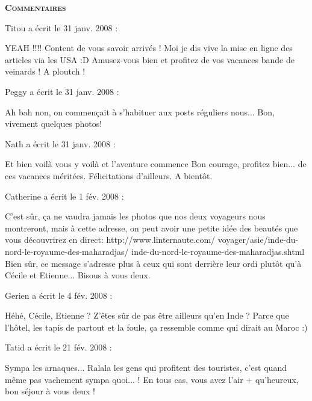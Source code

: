 \bigskip
\textbf{\textsc{Commentaires}}

\medskip
Titou a écrit le 31 janv. 2008 :
\begin{displayquote}
YEAH !!!!
Content de vous savoir arrivés ! Moi je dis vive la mise en ligne des articles via les USA :D Amusez-vous bien et profitez de vos vacances bande de veinards ! A ploutch !
\end{displayquote}

\medskip
Peggy a écrit le 31 janv. 2008 :
\begin{displayquote}
Ah bah non, on commençait à s'habituer aux posts réguliers nous... Bon, vivement quelques photos!
\end{displayquote}

\medskip
Nath a écrit le 31 janv. 2008 :
\begin{displayquote}
Et bien voilà vous y voilà  et l'aventure commence
Bon courage, profitez bien... de ces vacances méritées. Félicitations d'ailleurs.
A bientôt.
\end{displayquote}

\medskip
Catherine a écrit le 1 fév. 2008 :
\begin{displayquote}
C'est sûr, ça ne vaudra jamais les photos que nos deux voyageurs nous montreront, mais à cette adresse, on peut avoir une petite idée des beautés que vous découvrirez en direct: http://www.linternaute.com/
voyager/asie/inde-du-nord-le-royaume-des-maharadjas/
inde-du-nord-le-royaume-des-maharadjas.shtml
Bien sûr, ce message s'adresse plus à ceux qui sont derrière leur ordi plutôt qu'à Cécile et Etienne... Bisous à vous deux.
\end{displayquote}

\medskip
Gerien a écrit le 4 fév. 2008 :
\begin{displayquote}
Héhé,
Cécile, Etienne ? Z'êtes sûr de pas être ailleurs qu'en Inde ?
Parce que l'hôtel, les tapis de partout et la foule, ça ressemble comme qui dirait au Maroc :)
\end{displayquote}

\medskip
Tatid a écrit le 21 fév. 2008 :
\begin{displayquote}
Sympa les arnaques... Ralala les gens qui profitent des touristes, c'est quand même pas vachement sympa quoi... !
En tous cas, vous avez l'air + qu'heureux, bon séjour à vous deux !
\end{displayquote}

\vfill
